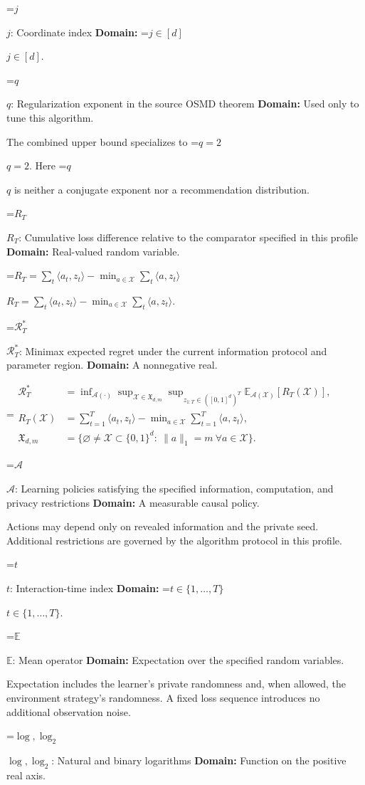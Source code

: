 \documentclass[10pt,a4paper]{article}
\newcommand{\AtlasMath}[1]{\par\begingroup\centering\setbox0=\hbox{$\displaystyle #1$}\ifdim\wd0>1.4\linewidth\typeout{ATLAS WIDE FORMULA: \the\wd0}\fi\ifdim\wd0>\linewidth\resizebox{\linewidth}{!}{\box0}\else\box0\fi\par\endgroup}
\newcommand{\AtlasInlineMath}[1]{\begingroup\setbox0=\hbox{$#1$}\ifdim\wd0>.4\linewidth\endgroup\AtlasMath{#1}\else\endgroup$#1$\fi}
\begin{document}
\AtlasInlineMath{j}: Coordinate index \textbf{Domain:} \AtlasInlineMath{j\in[d]}.

\AtlasInlineMath{q}: Regularization exponent in the source OSMD theorem \textbf{Domain:} Used only to tune this algorithm.

The combined upper bound specializes to \AtlasInlineMath{q=2}. Here \AtlasInlineMath{q} is neither a conjugate exponent nor a recommendation distribution.

\AtlasInlineMath{R_T}: Cumulative loss difference relative to the comparator specified in this profile \textbf{Domain:} Real-valued random variable.

\AtlasInlineMath{R_T=\sum_t\langle a_t,z_t\rangle-\min_{a\in\mathcal X}\sum_t\langle a,z_t\rangle}.

\AtlasInlineMath{\mathcal R_T^*}: Minimax expected regret under the current information protocol and parameter region. \textbf{Domain:} A nonnegative real.


\AtlasMath{\begin{aligned}\mathcal R_T^*&=\inf_{\mathcal A(\cdot)}\sup_{\mathcal X\in\mathfrak X_{d,m}}\sup_{z_{1:T}\in([0,1]^d)^T}\mathbb E_{\mathcal A(\mathcal X)}[R_T(\mathcal X)],\\ R_T(\mathcal X)&=\sum_{t=1}^T\langle a_t,z_t\rangle-\min_{a\in\mathcal X}\sum_{t=1}^T\langle a,z_t\rangle,\\ \mathfrak X_{d,m}&=\{\varnothing\ne\mathcal X\subset\{0,1\}^d:\ \|a\|_1=m\ \forall a\in\mathcal X\}.\end{aligned}}


\AtlasInlineMath{\mathcal A}: Learning policies satisfying the specified information, computation, and privacy restrictions \textbf{Domain:} A measurable causal policy.

Actions may depend only on revealed information and the private seed. Additional restrictions are governed by the algorithm protocol in this profile.

\AtlasInlineMath{t}: Interaction-time index \textbf{Domain:} \AtlasInlineMath{t\in\{1,\ldots,T\}}.

\AtlasInlineMath{\mathbb E}: Mean operator \textbf{Domain:} Expectation over the specified random variables.

Expectation includes the learner's private randomness and, when allowed, the environment strategy's randomness. A fixed loss sequence introduces no additional observation noise.

\AtlasInlineMath{\log,\log_2}: Natural and binary logarithms \textbf{Domain:} Function on the positive real axis.
\end{document}
